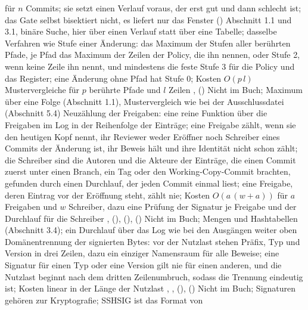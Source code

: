 für $n$ Commits; sie setzt einen Verlauf voraus, der erst gut und dann schlecht ist;
das Gate selbst bisektiert nicht, es liefert nur das Fenster \stopxcell
\startxcell {} () \stopxcell
\startxcell Abschnitt 1.1 und 3.1, binäre Suche, hier über einen Verlauf statt über eine
Tabelle; dasselbe Verfahren wie  \stopxcell
\stopxrow
\startxrow
\startxcell Stufe einer Änderung: das Maximum der Stufen aller berührten Pfade, je Pfad das
Maximum der Zeilen der Policy, die ihn nennen, oder Stufe 2, wenn keine Zeile ihn nennt,
und mindestens die feste Stufe 3 für die Policy und das Register;
eine Änderung ohne Pfad hat Stufe 0;
Kosten $O(p\,l)$ Mustervergleiche für $p$ berührte Pfade und $l$ Zeilen \stopxcell
\startxcell {},  () \stopxcell
\startxcell Nicht im Buch; Maximum über eine Folge (Abschnitt 1.1), Mustervergleich wie bei der
Ausschlussdatei (Abschnitt 5.4) \stopxcell
\stopxrow
\startxrow
\startxcell Neuzählung der Freigaben: eine reine Funktion über die Freigaben im Log in der
Reihenfolge der Einträge; eine Freigabe zählt, wenn sie den heutigen Kopf nennt,
ihr Reviewer weder Eröffner noch Schreiber eines Commits der Änderung ist, ihr Beweis hält
und ihre Identität nicht schon zählt; die Schreiber sind die Autoren
und die Akteure der Einträge, die einen Commit
zuerst unter einen Branch, ein Tag oder den Working-Copy-Commit brachten, gefunden durch einen
Durchlauf, der jeden Commit einmal liest; eine Freigabe, deren Eintrag vor der Eröffnung steht,
zählt nie; Kosten $O(a\,(w+a))$ für $a$ Freigaben und $w$ Schreiber,
dazu eine Prüfung der Signatur je Freigabe und der Durchlauf für die Schreiber \stopxcell
\startxcell {},  (), 
(),  () \stopxcell
\startxcell Nicht im Buch; Mengen und Hashtabellen (Abschnitt 3.4); ein Durchlauf über das Log
wie bei den Ausgängen weiter oben \stopxcell
\stopxrow
\startxrow
\startxcell Domänentrennung der signierten Bytes: vor der Nutzlast stehen Präfix, Typ und Version
in drei Zeilen, dazu ein einziger Namensraum für alle Beweise; eine Signatur für einen Typ oder
eine Version gilt nie für einen anderen, und die Nutzlast beginnt nach dem dritten Zeilenumbruch,
sodass die Trennung eindeutig ist; Kosten linear in der Länge der Nutzlast \stopxcell
\startxcell {}, ,  (),
 () \stopxcell
\startxcell Nicht im Buch; Signaturen gehören zur Kryptografie; SSHSIG ist das Format von
